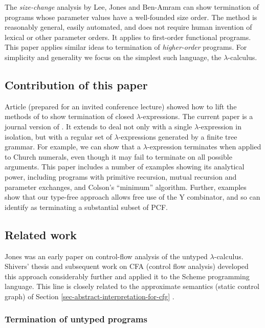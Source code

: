 \documentclass{LMCS}
\theoremstyle{definition}\newtheorem{env}[thm]{Environment}
\begin{document}
\noindent The {\em size-change} analysis by Lee, Jones and Ben-Amram
\cite{popl01} can show termination of programs whose parameter values
have a well-founded size order.  The method is reasonably general,
easily automated, and does not require human invention of lexical or
other parameter orders.  It applies to first-order functional
programs. This paper applies similar ideas to termination of {\em
higher-order} programs. For simplicity and generality we focus on the
simplest such language, the $\lambda$-calculus.


\subsection*{Contribution of this paper}

Article \cite{rta} (prepared for an invited conference lecture) showed
how to lift the methods of \cite{popl01} to show termination of closed
$\lambda$-expressions.  The current paper is a journal version of
\cite{rta}. It extends \cite{rta} to deal not only with a single
$\lambda$-expression in isolation, but with a regular set of
$\lambda$-expressions generated by a finite tree grammar.  For
example, we can show that a $\lambda$-expression terminates when
applied to Church numerals, even though it may fail to terminate on
all possible arguments.  This paper includes a number of examples
showing its analytical power, including programs with primitive
recursion, mutual recursion and parameter exchanges, and Colson's
``minimum'' algorithm.  Further, examples show that our type-free
approach allows free use of the Y combinator, and so can identify as
terminating a substantial subset of PCF.

\subsection{Related work}

Jones \cite{Jones:FALambda} was an early paper on control-flow analysis of the untyped $\lambda$-calculus.
Shivers' thesis and subsequent work  \cite{shivers1991,shivers2004} on CFA (control flow analysis) 
developed this approach considerably further and applied it to the Scheme
programming language. This line is
closely related to the approximate semantics (static control graph) 
of Section \ref{sec-abstract-interpretation-for-cfg}
 \cite{Jones:FALambda}.


\subsubsection*{Termination of untyped programs} 
\end{document}
